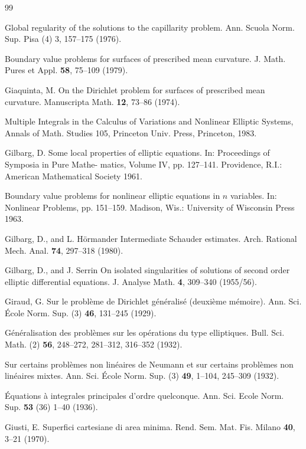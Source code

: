 \begin{thebibliography}{99}

Global regularity of the solutions to the capillarity problem. Ann. Scuola Norm. Sup.
Pisa (4) 3, 157--175 (1976).

Boundary value problems for surfaces of prescribed mean curvature. J. Math. Pures et
Appl. \textbf{58}, 75--109 (1979).

Giaquinta, M.
On the Dirichlet problem for surfaces of prescribed mean curvature. Manuscripta Math.
\textbf{12}, 73--86 (1974).

Multiple Integrals in the Calculus of Variations and Nonlinear Elliptic Systems, Annals of
Math. Studies 105, Princeton Univ. Press, Princeton, 1983.

Gilbarg, D.
Some local properties of elliptic equations. In: Proceedings of Symposia in Pure Mathe-
matics, Volume IV, pp. 127--141. Providence, R.I.: American Mathematical Society 1961.

Boundary value problems for nonlinear elliptic equations in $n$ variables. In: Nonlinear
Problems, pp. 151--159. Madison, Wis.: University of Wisconsin Press 1963.

Gilbarg, D., and L. Hörmander
Intermediate Schauder estimates. Arch. Rational Mech. Anal. \textbf{74}, 297--318 (1980).

Gilbarg, D., and J. Serrin
On isolated singularities of solutions of second order elliptic differential equations. J.
Analyse Math. \textbf{4}, 309--340 (1955/56).

Giraud, G.
Sur le problème de Dirichlet généralisé (deuxième mémoire). Ann. Sci. École Norm. Sup.
(3) \textbf{46}, 131--245 (1929).

Généralisation des problèmes sur les opérations du type elliptiques. Bull. Sci. Math. (2)
\textbf{56}, 248--272, 281--312, 316--352 (1932).

Sur certains problèmes non linéaires de Neumann et sur certains problèmes non linéaires
mixtes. Ann. Sci. École Norm. Sup. (3) \textbf{49}, 1--104, 245--309 (1932).

Équations à integrales principales d’ordre quelconque. Ann. Sci. Ecole Norm. Sup. \textbf{53}
(36) 1--40 (1936).

Giusti, E.
Superfici cartesiane di area minima. Rend. Sem. Mat. Fis. Milano \textbf{40}, 3--21 (1970).


\end{thebibliography}
